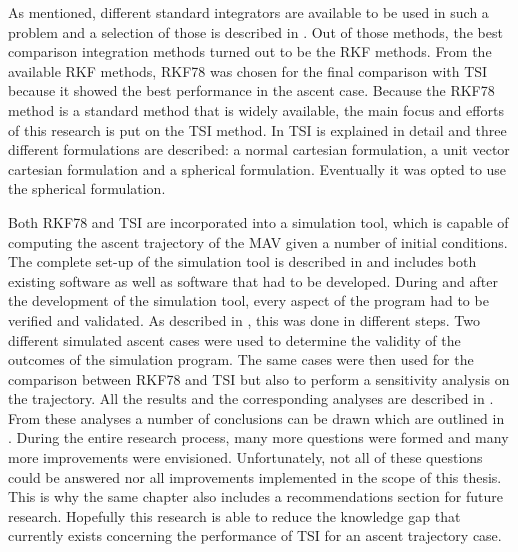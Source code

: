 As mentioned, different standard integrators are available to be used in such a problem and a selection of those is described in . Out of those methods, the best comparison integration methods turned out to be the \ac{RKF} methods. From the available \ac{RKF} methods, \acf{RKF78} was chosen for the final comparison with \ac{TSI} because it showed the best performance in the ascent case. 
Because the \ac{RKF78} method is a standard method that is widely available, the main focus and efforts of this research is put on the \ac{TSI} method. In  \ac{TSI} is explained in detail and three different formulations are described: a normal cartesian formulation, a unit vector cartesian formulation and a spherical formulation. Eventually it was opted to use the spherical formulation. 

Both \ac{RKF78} and \ac{TSI} are incorporated into a simulation tool, which is capable of computing the ascent trajectory of the \ac{MAV} given a number of initial conditions. The complete set-up of the simulation tool is described in  and includes both existing software as well as software that had to be developed. 
During and after the development of the simulation tool, every aspect of the program had to be verified and validated. As described in , this was done in different steps. Two different simulated ascent cases were used to determine the validity of the outcomes of the simulation program.
The same cases were then used for the comparison between \ac{RKF78} and \ac{TSI} but also to perform a sensitivity analysis on the trajectory. All the results and the corresponding analyses are described in .
From these analyses a number of conclusions can be drawn which are outlined in . During the entire research process, many more questions were formed and many more improvements were envisioned. Unfortunately, not all of these questions could be answered nor all improvements implemented in the scope of this thesis. This is why the same chapter also includes a recommendations section for future research. 
Hopefully this research is able to reduce the knowledge gap that currently exists concerning the performance of \ac{TSI} for an ascent trajectory case.





